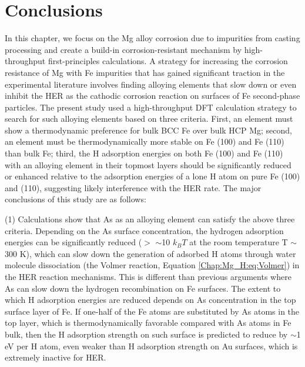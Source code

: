 \section{Conclusions}

In this chapter, we focus on the Mg alloy corrosion due to impurities from casting processing and create a build-in corrosion-resistant mechanism by high-throughput first-principles calculations. A strategy for increasing the corrosion resistance of Mg with Fe impurities that has gained significant traction in the experimental literature involves finding alloying elements that slow down or even inhibit the \ac{HER} as the cathodic corrosion reaction on surfaces of Fe second-phase particles. The present study used a high-throughput DFT calculation strategy to search for such alloying elements based on three criteria. First, an element must show a thermodynamic preference for bulk BCC Fe over bulk HCP Mg; second, an element must be thermodynamically more stable on Fe (100) and Fe (110) than bulk Fe; third, the H adsorption energies on both Fe (100) and Fe (110) with an alloying element in their topmost layers should be significantly reduced or enhanced relative to the adsorption energies of a lone H atom on pure Fe (100) and (110), suggesting likely interference with the \ac{HER} rate. The major conclusions of this study are as follows:

(1) Calculations show that As as an alloying element can satisfy the above three criteria. Depending on the As surface concentration, the hydrogen adsorption energies can be significantly reduced ($>$ $\sim$10 $k_{B}T$ at the room temperature T $\sim$ 300 K), which can slow down the generation of adsorbed H atoms through water molecule dissociation (the Volmer reaction, Equation \ref{Chap:Mg_H:eq:Volmer}) in the \ac{HER} reaction mechanisms. This is different than previous arguments where As can slow down the hydrogen recombination on Fe surfaces. The extent to which H adsorption energies are reduced depends on As concentration in the top surface layer of Fe. If one-half of the Fe atoms are substituted by As atoms in the top layer, which is thermodynamically favorable compared with As atoms in Fe bulk, then the H adsorption strength on such surface is predicted to reduce by $\sim$1 eV per H atom, even weaker than H adsorption strength on Au surfaces, which is extremely inactive for \ac{HER}.

